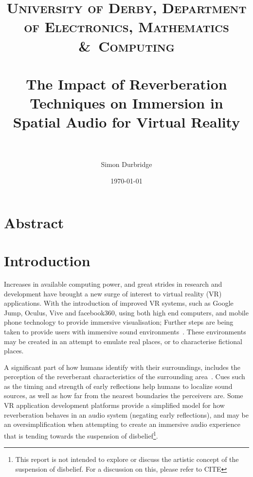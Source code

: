 \documentclass[paper=a4, fontsize=10pt, font=arial]{scrartcl} %
\title{	
\normalfont \normalsize 
\textsc{University of Derby, Department of Electronics, Mathematics \&\ Computing} \\ [25pt] %
\horrule{0.5pt} \\[0.4cm] %
\huge The Impact of Reverberation Techniques on Immersion in Spatial Audio for Virtual Reality \\ %
\horrule{2pt} \\[0.5cm] %
}
\author{Simon Durbridge} %
\date{\normalsize\today} %
\numberwithin{equation}{section} %
\numberwithin{figure}{section} %
\numberwithin{table}{section} %
\begin{document}
\maketitle %


\section{Abstract}

\newpage


\section{Introduction}

Increases in available computing power, and great strides in research and development have brought a new surge of interest to virtual reality (VR) applications. 
With the introduction of improved VR systems, such as Google Jump, Oculus, Vive and facebook360, using both high end computers, and mobile phone technology to provide immersive visualisation; Further steps are being taken to provide users with immersive sound environments~\cite{OculusCo41online}. 
These environments may be created in an  attempt to emulate real places, or to characterise fictional places.\par

A significant part of how humans identify with their surroundings, includes the perception of the reverberant characteristics of the surrounding area~\cite{rumsey2012spatial}. 
Cues such as the timing and strength of early reflections help humans to localize sound sources, as well as how far from the nearest boundaries the perceivers are. 
Some VR application development platforms provide a simplified model for how reverberation behaves in an audio system (negating early reflections), and may be an oversimplification when attempting to create an immersive audio experience that is tending towards the suspension of disbelief\footnote{This report is not intended to explore or discuss the artistic concept of the suspension of disbelief. For a discussion on this, please refer to CITE}.\par
\end{document}
